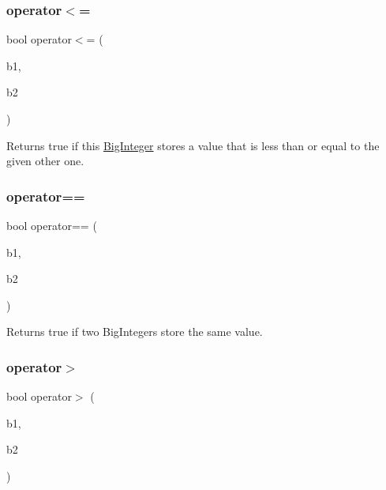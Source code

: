 \mbox{\label{classBigInteger_a73169242c1907d12830fe4110a5e2704}} 
\subsubsection{\texorpdfstring{operator$<$=}{operator<=}}
{\footnotesize\ttfamily bool operator$<$= (\begin{DoxyParamCaption}\item[{const \mbox{\hyperlink{classBigInteger}{Big\+Integer}} \&}]{b1,  }\item[{const \mbox{\hyperlink{classBigInteger}{Big\+Integer}} \&}]{b2 }\end{DoxyParamCaption})\hspace{0.3cm}{\ttfamily [friend]}}



Returns true if this \mbox{\hyperlink{classBigInteger}{Big\+Integer}} stores a value that is less than or equal to the given other one. 

\mbox{\label{classBigInteger_acdbc3e3ed5ef2535a628df89780d0a9b}} 
\subsubsection{\texorpdfstring{operator==}{operator==}}
{\footnotesize\ttfamily bool operator== (\begin{DoxyParamCaption}\item[{const \mbox{\hyperlink{classBigInteger}{Big\+Integer}} \&}]{b1,  }\item[{const \mbox{\hyperlink{classBigInteger}{Big\+Integer}} \&}]{b2 }\end{DoxyParamCaption})\hspace{0.3cm}{\ttfamily [friend]}}



Returns true if two Big\+Integers store the same value. 

\mbox{\label{classBigInteger_a6a9bb9ae99920398555f337f66044594}} 
\subsubsection{\texorpdfstring{operator$>$}{operator>}}
{\footnotesize\ttfamily bool operator$>$ (\begin{DoxyParamCaption}\item[{const \mbox{\hyperlink{classBigInteger}{Big\+Integer}} \&}]{b1,  }\item[{const \mbox{\hyperlink{classBigInteger}{Big\+Integer}} \&}]{b2 }\end{DoxyParamCaption})\hspace{0.3cm}{\ttfamily [friend]}}



